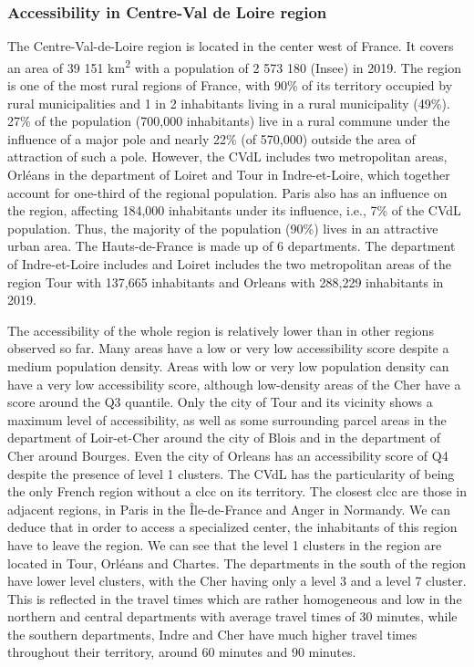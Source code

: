 \subsubsection{Accessibility in Centre-Val de Loire region}

The Centre-Val-de-Loire region is located in the center west of France. It
covers an area of 39 151 km\textsuperscript{2} with a population of 2 573 180
(Insee) in 2019. The region is one of the most rural regions of France, with
90\% of its territory occupied by rural municipalities and 1 in 2 inhabitants
living in a rural municipality (49\%). 27\% of the population (700,000
inhabitants) live in a rural commune under the influence of a major pole and
nearly 22\% (of 570,000) outside the area of attraction of such a pole. However,
the CVdL includes two metropolitan areas, Orléans in the department of Loiret
and Tour in Indre-et-Loire, which together account for one-third of the regional
population. Paris also has an influence on the region, affecting 184,000
inhabitants under its influence, i.e., 7\% of the CVdL population. Thus, the
majority of the population (90\%) lives in an attractive urban area. The
Hauts-de-France is made up of 6 departments. The department of Indre-et-Loire
includes and Loiret includes the two metropolitan areas of the region Tour with
137,665 inhabitants and Orleans with 288,229 inhabitants in 2019.

The accessibility of the whole region is relatively lower than in other regions
observed so far. Many areas have a low or very low accessibility score despite a
medium population density. Areas with low or very low population density can
have a very low accessibility score, although low-density areas of the Cher have
a score around the Q3 quantile. Only the city of Tour and its vicinity shows a
maximum level of accessibility, as well as some surrounding parcel areas in the
department of Loir-et-Cher around the city of Blois and in the department of
Cher around Bourges. Even the city of Orleans has an accessibility score of Q4
despite the presence of level 1 clusters. The CVdL has the particularity of
being the only French region without a \ac{clcc} on its territory. The closest
\ac{clcc} are those in adjacent regions, in Paris in the Île-de-France and Anger
in Normandy. We can deduce that in order to access a specialized center, the
inhabitants of this region have to leave the region.  We can see that the level
1 clusters in the region are located in Tour, Orléans and Chartes. The
departments in the south of the region have lower level clusters, with the Cher
having only a level 3 and a level 7 cluster. This is reflected in the travel
times which are rather homogeneous and low in the northern and central
departments with average travel times of 30 minutes, while the southern
departments, Indre and Cher have much higher travel times throughout their
territory, around 60 minutes and 90 minutes.

